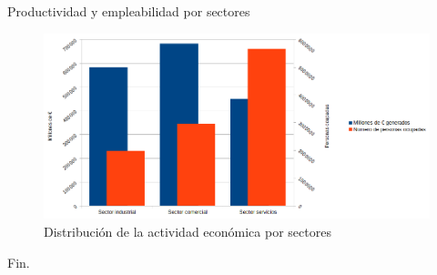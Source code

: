 \documentclass{beamer}
\begin{document}
\begin{frame}{Productividad y empleabilidad por sectores}
\begin{figure}[H]
  \centering
  \includegraphics[width=\textwidth]{../graficos/barras_sectores}
  \caption{Distribución de la actividad económica por sectores}
\end{figure}
\end{frame}

\begin{frame}

  Fin.

\end{frame}
\end{document}
